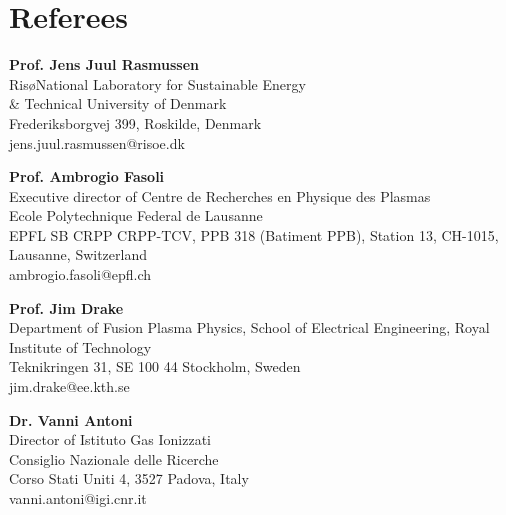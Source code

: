 \section{Referees}

\vspace{.5cm}

\textbf{Prof. Jens Juul Rasmussen} \\
Ris\o National Laboratory for Sustainable Energy \\
\& Technical University of Denmark \\
Frederiksborgvej 399, Roskilde, Denmark\\
jens.juul.rasmussen@risoe.dk

\vspace{1cm}

\textbf{Prof. Ambrogio Fasoli}\\
Executive director of Centre de Recherches en Physique des Plasmas \\
Ecole Polytechnique Federal de Lausanne \\
EPFL SB CRPP CRPP-TCV,  PPB 318 (Batiment PPB), Station 13, CH-1015,
Lausanne, Switzerland\\
ambrogio.fasoli@epfl.ch

\vspace{1cm}

\textbf{Prof. Jim Drake}\\
Department of Fusion Plasma Physics, School of Electrical Engineering, Royal Institute of Technology \\
Teknikringen 31, SE 100 44 Stockholm, Sweden \\
jim.drake@ee.kth.se

\vspace{1cm}

\textbf{Dr. Vanni Antoni}\\
Director of Istituto Gas Ionizzati \\
Consiglio Nazionale delle Ricerche \\
Corso Stati Uniti 4, 3527 Padova, Italy \\
vanni.antoni@igi.cnr.it
